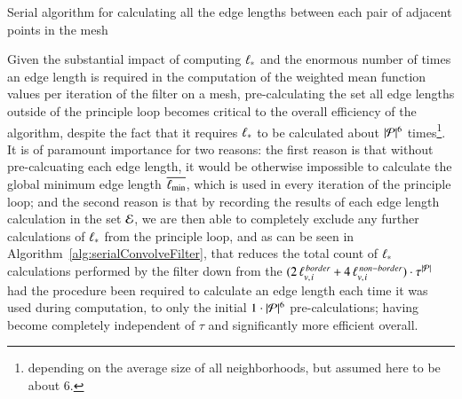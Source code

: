 \begin{algorithm}[ht]
	\DontPrintSemicolon


	\bigskip
	\caption{Serial algorithm for calculating all the edge lengths between each pair of adjacent points in the mesh\label{alg:serialCalculateEdgeLengths}}
\end{algorithm}

Given the substantial impact of computing ${\ell_\ast}$ and the enormous number of times an edge length is required in the computation of the weighted mean function values per iteration of the filter on a mesh, pre-calculating the set all edge lengths outside of the principle loop becomes critical to the overall efficiency of the algorithm, despite the fact that it requires ${\ell_\ast}$ to be calculated about $|\mathcal{P}|^6$ times\footnote{depending on the average size of all neighborhoods, but assumed here to be about 6.}. It is of paramount importance for two reasons: the first reason is that without pre-calcuating each edge length, it would be otherwise impossible to calculate the global minimum  edge length $\overline{\ell_\text{min}}$, which is used in every iteration of the principle loop; and the second reason is that by recording the results of each edge length calculation in the set $\mathcal{E}$, we are then able to completely exclude any further calculations of $\ell_\ast$ from the principle loop, and as can be seen in Algorithm~\ref{alg:serialConvolveFilter}, that reduces the total count of $\ell_\ast$ calculations performed by the filter down from the $(2\,\ell_{v,\kern.75pt i}^{\,border} + 4\,\ell_{v,\kern.75pt i}^{\,non-border})\cdot\tau^{|\mathcal{P}|}$ had the procedure been required to calculate an edge length each time it was used during computation, to only the initial $1\cdot |\mathcal{P}|^6$ pre-calculations; having become completely independent of $\tau$ and significantly more efficient overall.%
%

